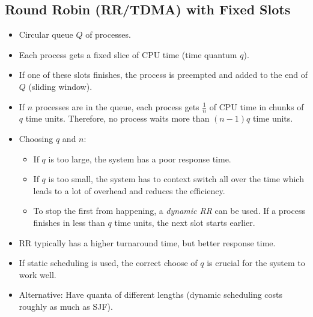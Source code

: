         \subsection{Round Robin (RR/TDMA) with Fixed Slots}
            \begin{itemize}
            	\item Circular queue \(Q\) of processes.
            	\item Each process gets a fixed slice of CPU time (time quantum \(q\)).
                \item If one of these slots finishes, the process is preempted and added to the end of \(Q\) (sliding window).
                \item If \(n\) processes are in the queue, each process gets \( \frac{1}{n} \) of CPU time in chunks of \(q\) time units. Therefore, no process waits more than \( (n - 1)q \) time units.
                \item Choosing \(q\) and \(n\):
	                \begin{itemize}
	                	\item If \(q\) is too large, the system has a poor response time.
	                	\item If \(q\) is too small, the system has to context switch all over the time which leads to a lot of overhead and reduces the efficiency.
	                	\item To stop the first from happening, a \textit{dynamic RR} can be used. If a process finishes in less than \(q\) time units, the next slot starts earlier.
	                \end{itemize}
                \item RR typically has a higher turnaround time, but better response time.
                \item If static scheduling is used, the correct choose of \(q\) is crucial for the system to work well.
                \item Alternative: Have quanta of different lengths (dynamic scheduling costs roughly as much as SJF).
            \end{itemize}
        
